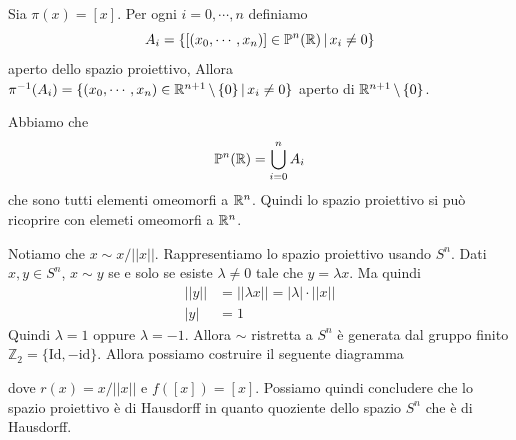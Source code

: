 \documentclass[a4paper]{article}
\begin{document}
\begin{radioactive}
Sia \(\pi(x) = [x]\).
Per ogni \(i=0, \cdots, n\) definiamo
\[
    A_i = \{[(x_0, \cdots, x_n)] \in \mathbb{P}^n(\mathbb{R}) \,|\, x_i \neq 0\}
\]
aperto dello spazio proiettivo,
Allora \(\pi^{-1}(A_i) = \{(x_0, \cdots, x_n) \in \mathbb{R}^{n+1} \,\backslash\, \{0\} \,|\, x_i \neq 0\}\)
aperto di \(\mathbb{R}^{n+1} \,\backslash\, \{0\}\).

Abbiamo che
\[
    \mathbb{P}^n(\mathbb{R}) = \bigcup_{i=0}^n A_i
\]
che sono tutti elementi omeomorfi a \(\mathbb{R}^n\).
Quindi lo spazio proiettivo si può ricoprire con elemeti omeomorfi a \(\mathbb{R}^n\).

Notiamo che \(x \sim x / ||x||\).
Rappresentiamo lo spazio proiettivo usando \(S^n\).
Dati \(x,y \in S^n\), \(x\sim y\) se e solo se esiste \(\lambda \neq 0\) tale che
\(y = \lambda x\). Ma quindi
\begin{align*}
    ||y|| &= ||\lambda x|| = |\lambda| \cdot ||x|| \\
    |y| &= 1
\end{align*}
Quindi \(\lambda = 1\) oppure \(\lambda = -1\).
Allora \(\sim\) ristretta a \(S^n\) è generata dal gruppo finito \(\mathbb{Z}_2 = \{\text{Id}, -\text{id}\}\).
Allora possiamo costruire il seguente diagramma
\begin{center}
\end{center}
dove \(r(x) = x/||x||\) e \(f([x]) = [x]\).
Possiamo quindi concludere che lo spazio proiettivo è di Hausdorff
in quanto quoziente dello spazio \(S^n\) che è di Hausdorff.
\end{radioactive}
\end{document}
